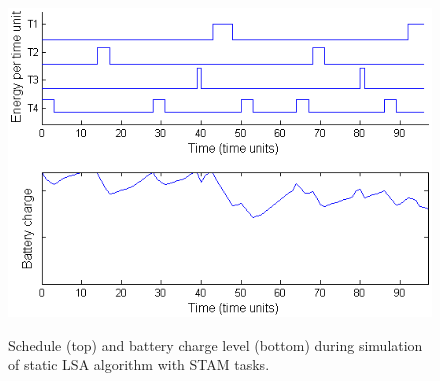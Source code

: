 \begin{figure}
\begin{center}
\includegraphics[scale=0.57]{lsastambattery.png}
\label{fig:lsastambattery}
\caption{Schedule (top) and battery charge level (bottom) during simulation of static LSA algorithm with STAM tasks.}
\end{center}
\end{figure}



































